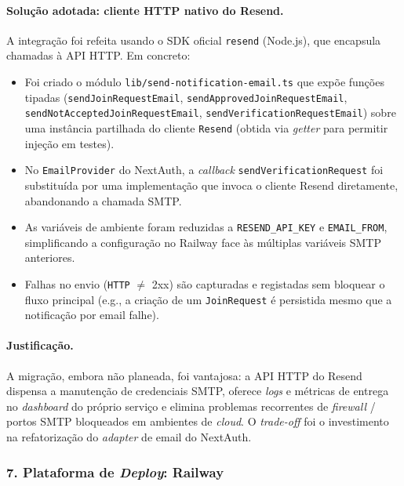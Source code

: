 \documentclass[11pt,a4paper]{article}
\begin{document}
\paragraph{Solução adotada: cliente HTTP nativo do Resend.}
A integração foi refeita usando o SDK oficial \texttt{resend} (Node.js), que
encapsula chamadas à API HTTP. Em concreto:

\begin{itemize}[leftmargin=*]
    \item Foi criado o módulo \texttt{lib/send-notification-email.ts} que expõe
          funções tipadas (\texttt{sendJoinRequestEmail},
          \texttt{sendApprovedJoinRequestEmail},
          \texttt{sendNotAcceptedJoinRequestEmail},
          \texttt{sendVerificationRequestEmail}) sobre uma instância partilhada do
          cliente \texttt{Resend} (obtida via \emph{getter} para permitir
          injeção em testes).
    \item No \texttt{EmailProvider} do NextAuth, a \emph{callback}
          \texttt{sendVerificationRequest} foi substituída por uma implementação
          que invoca o cliente Resend diretamente, abandonando a chamada SMTP.
    \item As variáveis de ambiente foram reduzidas a \texttt{RESEND\_API\_KEY}
          e \texttt{EMAIL\_FROM}, simplificando a configuração no Railway face às
          múltiplas variáveis SMTP anteriores.
    \item Falhas no envio (\texttt{HTTP} $\neq$ 2xx) são capturadas e registadas
          sem bloquear o fluxo principal (e.g., a criação de um \texttt{JoinRequest}
          é persistida mesmo que a notificação por email falhe).
\end{itemize}

\paragraph{Justificação.} A migração, embora não planeada, foi vantajosa: a API
HTTP do Resend dispensa a manutenção de credenciais SMTP, oferece \emph{logs} e
métricas de entrega no \emph{dashboard} do próprio serviço e elimina problemas
recorrentes de \emph{firewall} / portos SMTP bloqueados em ambientes de
\emph{cloud}. O \emph{trade-off} foi o investimento na refatorização do
\emph{adapter} de email do NextAuth.

\subsubsection{7. Plataforma de \emph{Deploy}: Railway}\label{sec:railway}
\end{document}
